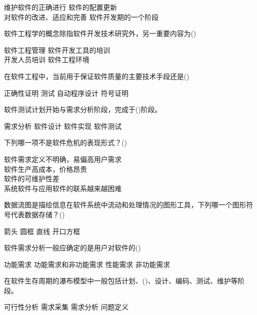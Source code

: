 \documentclass[answers]{exam}
\begin{document}
\begin{questions}
\begin{oneparchoices}
		\choice 维护软件的正确进行
		\choice 软件的配置更新\\
		\choice 对软件的改进、适应和完善
		\choice 软件开发期的一个阶段
	\end{oneparchoices}
	\question 软件工程学的概念除指软件开发技术研究外，另一重要内容为()\\
	\begin{oneparchoices}
		\choice 软件工程管理
		\choice 软件开发工具的培训\\
		\choice 开发人员培训
		\choice 软件工程环境
	\end{oneparchoices}
	\question 在软件工程中，当前用于保证软件质量的主要技术手段还是()\\
	\begin{oneparchoices}
		\choice 正确性证明
		\choice 测试
		\choice 自动程序设计
		\choice 符号证明
	\end{oneparchoices}
	\question 软件测试计划开始与需求分析阶段，完成于()阶段。\\
	\begin{oneparchoices}
		\choice 需求分析
		\choice 软件设计
		\choice 软件实现
		\choice 软件测试
	\end{oneparchoices}
	\question 下列哪一项不是软件危机的表现形式？()\\
	\begin{oneparchoices}
		\choice 软件需求定义不明确，易偏高用户需求\\
		\choice 软件生产高成本，价格昂贵\\
		\choice 软件的可维护性差\\
		\choice 系统软件与应用软件的联系越来越困难
	\end{oneparchoices}
	\question 数据流图是描绘信息在软件系统中流动和处理情况的图形工具，下列哪一个图形符号代表数据存储？()\\
	\begin{oneparchoices}
		\choice 箭头
		\choice 圆框
		\choice 直线
		\choice 开口方框
	\end{oneparchoices}
	\question 软件需求分析一般应确定的是用户对软件的()\\
	\begin{oneparchoices}
		\choice 功能需求
		\choice 功能需求和非功能需求
		\choice 性能需求
		\choice 非功能需求
	\end{oneparchoices}
	\question 在软件生存周期的瀑布模型中一般包括计划、()、设计、编码、测试、维护等阶段。\\
	\begin{oneparchoices}
		\choice 可行性分析
		\choice 需求采集
		\choice 需求分析
		\choice 问题定义

\end{oneparchoices}
\end{questions}
\end{document}
